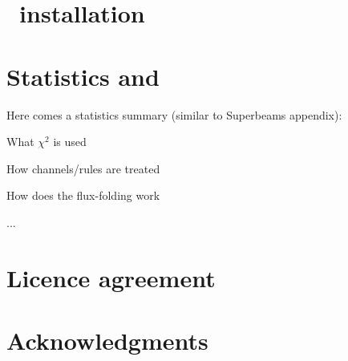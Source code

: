 
\begin{appendix}

\chapter{\GLOBES\ installation}

\chapter{Statistics and \GLOBES }

Here comes a statistics summary (similar to Superbeams appendix):
\bi
\item
 What $\chi^2$ is used
\item
 How channels/rules are treated
\item
 How does the flux-folding work
\item
 ...
\ei

\chapter{Licence agreement}

\chapter*{Acknowledgments}

\end{appendix}
